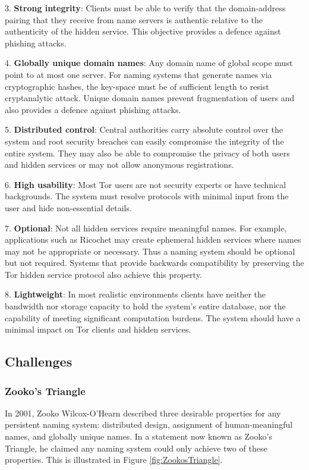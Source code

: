 \documentclass[USenglish,oneside,twocolumn]{article}
\begin{document}
3. \textbf{Strong integrity}: Clients must be able to verify that the domain-address pairing that they receive from name servers is authentic relative to the authenticity of the hidden service. This objective provides a defence against phishing attacks.

4. \textbf{Globally unique domain names}: Any domain name of global scope must point to at most one server. For naming systems that generate names via cryptographic hashes, the key-space must be of sufficient length to resist cryptanalytic attack. Unique domain names prevent fragmentation of users and also provides a defence against phishing attacks.

5. \textbf{Distributed control}: Central authorities carry absolute control over the system and root security breaches can easily compromise the integrity of the entire system. They may also be able to compromise the privacy of both users and hidden services or may not allow anonymous registrations.

6. \textbf{High usability}: Most Tor users are not security experts or have technical backgrounds. The system must resolve protocols with minimal input from the user and hide non-essential details.

7. \textbf{Optional}: Not all hidden services require meaningful names. For example, applications such as Ricochet \cite{RicochetGithub} may create ephemeral hidden services where names may not be appropriate or necessary. Thus a naming system should be optional but not required. Systems that provide backwards compatibility by preserving the Tor hidden service protocol also achieve this property.

8. \textbf{Lightweight}: In most realistic environments clients have neither the bandwidth nor storage capacity to hold the system's entire database, nor the capability of meeting significant computation burdens. The system should have a minimal impact on Tor clients and hidden services.

\subsection{Challenges}

\subsubsection{Zooko's Triangle}
\label{sec:ZookosTriangle}

In 2001, Zooko Wilcox-O'Hearn described three desirable properties for any persistent naming system: distributed design, assignment of human-meaningful names, and globally unique names. In a statement now known as Zooko's Triangle, \cite{ferdous2009security}\cite{stiegler2005petname} he claimed any naming system could only achieve two of these properties. This is illustrated in Figure \ref{fig:ZookosTriangle}.
\end{document}
